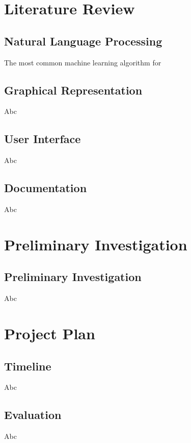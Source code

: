 	\section{Literature Review} \label{sec:litrev}	
		\subsection{Natural Language Processing}
			The most common machine learning algorithm for 
		\subsection{Graphical Representation}
			Abc
		\subsection{User Interface}
			Abc
		\subsection{Documentation}
			Abc
	\section{Preliminary Investigation}
		\subsection{Preliminary Investigation}
			Abc
	\section{Project Plan}
		\subsection{Timeline}
			Abc
		\subsection{Evaluation}
			Abc
